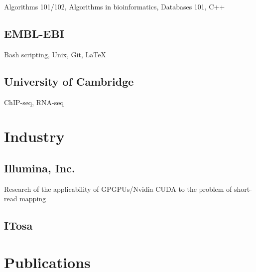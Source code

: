 \documentclass{klmr-cv}
\newcommand*\cpp{C++}
\begin{document}
\date{2008--2011}
\item{}
\item{Algorithms 101/102, Algorithms in bioinformatics, Databases 101, \cpp}

\subsection{EMBL-EBI}

\date{2011--2014}
\item{}
\item{Bash scripting, Unix, Git, \LaTeX}

\subsection{University of Cambridge}

\date{2013--2015}
\item{}
\item{ChIP-seq, RNA-seq}

\section{Industry}

\subsection{Illumina, Inc.}

\date{Oct 2008--Feb 2009}
\item{}
\item{Research of the applicability of GPGPUs/Nvidia CUDA to the problem of
        short-read mapping}

\subsection{ITosa}

\date{Jan 2007--Jan 2008}
\item{}

\section{Publications}

\end{document}
